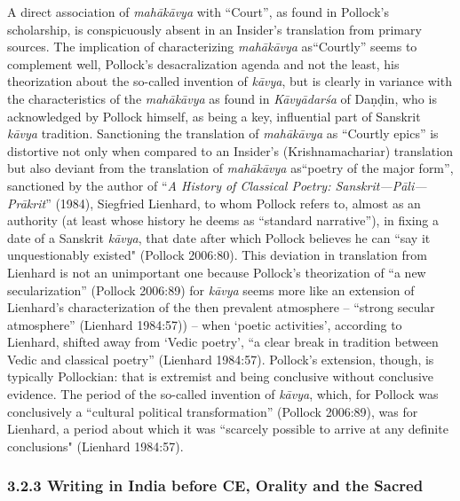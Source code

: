A direct association of \textit{mahākāvya} with “Court”, as found in Pollock’s scholarship, is conspicuously absent in an Insider’s translation from primary sources. The implication of characterizing \textit{mahākāvya} as\break “Courtly” seems to complement well, Pollock’s desacralization agenda and not the least, his theorization about the so-called invention of \textit{kāvya}, but is clearly in variance with the characteristics of the \textit{mahā\-kāvya} as found in \textit{Kāvyādarśa} of Daṇḍin, who is acknowledged by Pollock himself, as being a key, influential part of Sanskrit \textit{kāvya} tradition. Sanctioning the translation of \textit{mahākāvya} as “Courtly epics” is distortive not only when compared to an Insider’s (Krishnamachariar) translation but also deviant from the translation of \textit{mahākāvya} as\break “poetry of the major form”, sanctioned by the author of “\textit{A History of Classical Poetry: Sanskrit—Pāli—Prākrit}”\textit{} (1984), Siegfried Lienhard, to whom Pollock refers to, almost as an authority (at least whose history he deems as “standard narrative”), in fixing a date of a Sanskrit \textit{kāvya}, that date after which Pollock believes he can “say it unquestionably existed" (Pollock 2006:80). This deviation in translation from Lienhard is not an unimportant one because Pollock’s theorization of “a new secularization” (Pollock 2006:89) for \textit{kāvya} seems more like an extension of Lienhard’s characterization of the then prevalent atmosphere – “strong secular atmosphere” (Lienhard 1984:57)) – when ‘poetic activities’, according to Lienhard, shifted away from ‘Vedic poetry’, “a clear break in tradition between Vedic and classical poetry” (Lienhard 1984:57). Pollock’s extension, though, is typically Pollockian: that is extremist and being conclusive without conclusive evidence. The period of the so-called invention of \textit{kāvya}, which, for Pollock was conclusively a “cultural political transformation” (Pollock 2006:89), was for Lienhard, a period about which it was “scarcely possible to arrive at any definite conclusions" (Lienhard 1984:57).


\subsubsection*{3.2.3 Writing in India before CE, Orality and the Sacred}

\vskip -3pt

